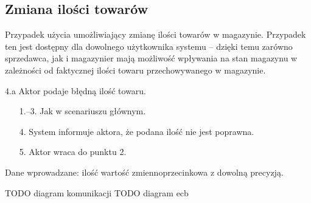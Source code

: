 \subsection{Zmiana ilości towarów}
Przypadek użycia umożliwiający zmianę ilości towarów w magazynie.
Przypadek ten jest dostępny dla dowolnego użytkownika systemu -- dzięki
temu zarówno sprzedawca, jak i magazynier mają możliwość wpływania 
na stan magazynu w zależności od faktycznej ilości towaru przechowywanego
w magazynie.
\begin{usecase}
   {
     \item[4.a] Aktor podaje błędną ilość towaru.
       \begin{enumerate}
          \item[1.--3.] Jak w scenariuszu głównym.
          \item[4.] System informuje aktora, że podana ilość nie jest poprawna.
          \item[5.] Aktor wraca do punktu 2.
       \end{enumerate}
  }
   {
    Dane wprowadzane: ilość wartość zmiennoprzecinkowa z dowolną precyzją.
  }
\end{usecase}
TODO diagram komunikacji TODO diagram ecb
